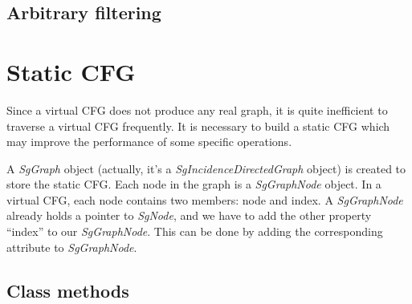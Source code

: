 \subsection{Arbitrary filtering}

\section{Static CFG}

Since a virtual CFG does not produce any real graph, it is quite inefficient to
traverse a virtual CFG frequently. It is necessary to build a static CFG which may
improve the performance of some specific operations. 

A \textit{SgGraph} object (actually, it's a \textit{SgIncidenceDirectedGraph} object) is created to 
store the static CFG. Each node in the graph is a \textit{SgGraphNode} object. In a virtual 
CFG, each node contains two members: node and index. A \textit{SgGraphNode} already holds a 
pointer to \textit{SgNode}, and we have to add the other property ``index'' to our \textit{SgGraphNode}.
This can be done by adding the corresponding attribute to \textit{SgGraphNode}.

\subsection{Class methods}

